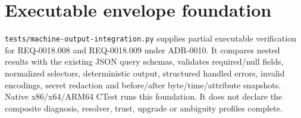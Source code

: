 \documentclass[letterpaper]{article}
\begin{document}
\section*{Executable envelope foundation}
\texttt{tests/machine-output-integration.py} supplies partial executable
verification for REQ-0018.008 and REQ-0018.009 under ADR-0010. It compares
nested results with the existing JSON query schemas, validates required/null
fields, normalized selectors, deterministic output, structured handled errors,
invalid encodings, secret redaction and before/after byte/time/attribute
snapshots. Native x86/x64/ARM64 CTest runs this foundation. It does not declare
the composite diagnosis, resolver, trust, upgrade or ambiguity profiles complete.
\end{document}
